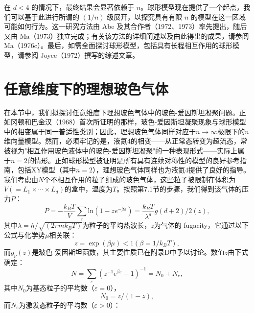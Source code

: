 在 \(d<4\) 的情况下，最终结果会显著依赖于 \(n\)。球形模型现在提供了一个起点，我们可以基于此进行所谓的 \((1/n)\) 级展开，以探究具有有限 \(n\) 的模型在这一区域可能如何行为。这一研究方法由 Abe 及其合作者（1972、1973）率先提出，随后又由 Ma（1973）独立完成；有关该方法的详细阐述以及由此得出的成果，请参阅 Ma（1976c）。最后，如需全面探讨球形模型，包括具有长程相互作用的球形模型，请参阅 Joyce（1972）撰写的综述文章。
\section{任意维度下的理想玻色气体}\label{ux4efbux610fux7ef4ux5ea6ux4e0bux7684ux7406ux60f3ux73bbux8272ux6c14ux4f53}
在本节中，我们拟探讨任意维度下理想玻色气体中的玻色-爱因斯坦凝聚问题。正如冈顿和巴金汉（1968）首次所证明的那样，玻色-爱因斯坦凝聚现象与球形模型中的相变属于同一普适性类别；因此，理想玻色气体同样对应于\(n \to \infty\)极限下的\(n\)维向量模型。然而，必须牢记的是，液氦4的相变——从正常态转变为超流态，常被视为"相互作用玻色液体中的玻色-爱因斯坦凝聚"的一种表现形式——实际上属于\(n=2\)的情形。正如球形模型被证明是所有具有连续对称性的模型的良好参考指南，包括XY模型（其中\(n=2\)），理想玻色气体同样也为液氦4提供了良好的指导。
我们考虑由\(N\)个不相互作用的粒子组成的玻色气体，这些粒子被限制在体积为\(V(=L_1 \times \cdots \times L_d)\)的盒中，温度为\(T\)。按照第7.1节的步骤，我们得到该气体的压力\(P\)：
\begin{equation}\tag{13.6.1}\label{eq:13.6.1}
P = - \frac { k _ { B } T } { V } \sum _ { \varepsilon } \mathrm { l n } ( 1 - z e ^{- \beta \varepsilon} ) = \frac { k _ { B } T } { \lambda ^{d} } g ( d + 2 ) / 2 ( z ) ,
\end{equation}
其中\(\lambda = h/\sqrt{(2\pi mk_{B}T)}\)为粒子的平均热波长，\(z\)为气体的 fugacity，它通过以下公式与化学势\(\mu\)相关联：
\begin{equation}\tag{13.6.2}\label{eq:13.6.2}
z = \exp ( \beta \mu ) < 1  ( \beta = 1 / k _ { B } T ) ,
\end{equation}
而\(g_{\nu}(z)\)是玻色-爱因斯坦函数，其主要性质已在附录D中予以讨论。数值\(z\)由下式确定：
\begin{equation}\tag{13.6.3}\label{eq:13.6.3}
N = \sum _ { \varepsilon } ( z ^{- 1} e ^{\beta \varepsilon} - 1 ) ^{- 1} = N _ { 0 } + N _ { e } ,
\end{equation}
其中\(N_{0}\)为基态粒子的平均数（\(\varepsilon=0\)），
\begin{equation}\tag{13.6.4}\label{eq:13.6.4}
N _ { 0 } = z / ( 1 - z ) ,
\end{equation}
而\(N_{e}\)为激发态粒子的平均数（\(\varepsilon > 0\)）：
